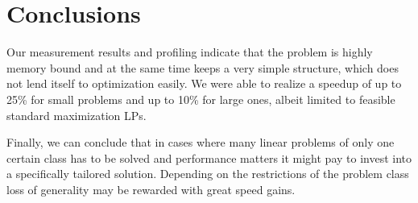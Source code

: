 \documentclass[letterpaper]{article}
\begin{document}

\section{Conclusions}

Our measurement results and profiling indicate that the problem is highly memory bound and at the same time keeps
a very simple structure, which does not lend itself to optimization easily.
We were able to realize a speedup of up to 25\% for small problems and up to 10\% for large ones,
albeit limited to feasible standard maximization LPs.

Finally, we can conclude that in cases where many linear problems of only one certain 
class has to be solved and performance matters it might pay to invest into a specifically
tailored solution. Depending on the restrictions of the problem class loss of generality
may be rewarded with great speed gains.






\end{document}
